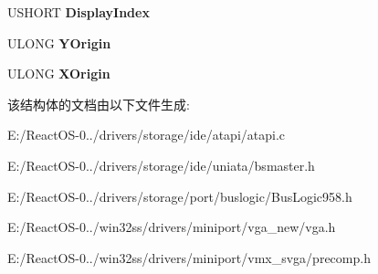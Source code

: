 \begin{DoxyCompactItemize}
U\+S\+H\+O\+RT {\bfseries Display\+Index}
\item 
\mbox{\label{struct___h_w___d_e_v_i_c_e___e_x_t_e_n_s_i_o_n_aea0d81cfaf98386205a3b7a407e2ed5e}} 
U\+L\+O\+NG {\bfseries Y\+Origin}
\item 
\mbox{\label{struct___h_w___d_e_v_i_c_e___e_x_t_e_n_s_i_o_n_af854b32bc89ed632d0d5785241ae1913}} 
U\+L\+O\+NG {\bfseries X\+Origin}
\end{DoxyCompactItemize}


该结构体的文档由以下文件生成\+:\begin{DoxyCompactItemize}
\item 
E\+:/\+React\+O\+S-\/0../drivers/storage/ide/atapi/atapi.\+c\item 
E\+:/\+React\+O\+S-\/0../drivers/storage/ide/uniata/bsmaster.\+h\item 
E\+:/\+React\+O\+S-\/0../drivers/storage/port/buslogic/Bus\+Logic958.\+h\item 
E\+:/\+React\+O\+S-\/0../win32ss/drivers/miniport/vga\+\_\+new/vga.\+h\item 
E\+:/\+React\+O\+S-\/0../win32ss/drivers/miniport/vmx\+\_\+svga/precomp.\+h\end{DoxyCompactItemize}
